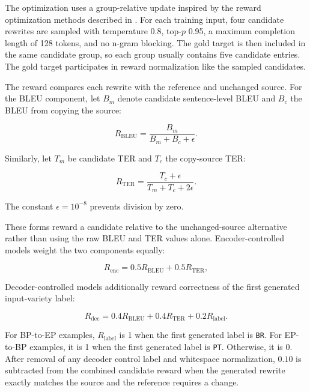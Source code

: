 The optimization uses a group-relative update inspired by the reward
optimization methods described in 
\citep{Shao2024DeepSeekMathPT}. For each training
input, four candidate rewrites are sampled with temperature 0.8, top-\(p\)
0.95, a maximum completion length of 128 tokens, and no n-gram blocking. The
gold target is then included in the same candidate group, so each group usually
contains five candidate entries. The gold target participates in reward
normalization like the sampled candidates.

The reward compares each rewrite with the reference and unchanged
source. For the BLEU component, let \(B_m\) denote candidate sentence-level BLEU
and \(B_c\) the BLEU from copying the source:

\begin{equation}
R_{\mathrm{BLEU}}
=
\frac{B_m}{B_m+B_c+\epsilon}.
\end{equation}

Similarly, let \(T_m\) be candidate TER and \(T_c\) the copy-source TER:

\begin{equation}
R_{\mathrm{TER}}
=
\frac{T_c+\epsilon}{T_m+T_c+2\epsilon}.
\end{equation}

The constant \(\epsilon=10^{-8}\) prevents division by zero.

These forms reward a candidate relative to the unchanged-source alternative
rather than using the raw BLEU and TER values alone. Encoder-controlled models
weight the two components equally:

\begin{equation}
R_{\mathrm{enc}}
=
0.5R_{\mathrm{BLEU}}
+
0.5R_{\mathrm{TER}},
\end{equation}

Decoder-controlled models additionally reward correctness of the first
generated input-variety label:

\begin{equation}
R_{\mathrm{dec}}
=
0.4R_{\mathrm{BLEU}}
+
0.4R_{\mathrm{TER}}
+
0.2R_{\mathrm{label}}.
\end{equation}

For BP-to-EP examples, \(R_{\mathrm{label}}\) is 1 when the first generated
label is \texttt{BR}. For EP-to-BP examples, it is 1 when the first generated
label is \texttt{PT}. Otherwise, it is 0. After removal of any decoder control
label and whitespace normalization, \(0.10\) is subtracted from the combined
candidate reward when the generated rewrite exactly matches the source and the
reference requires a change.

